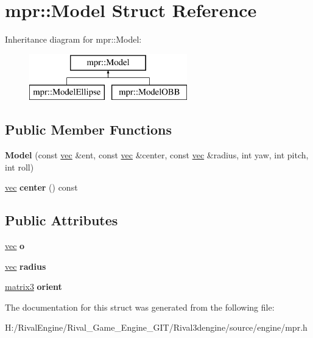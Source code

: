 \hypertarget{structmpr_1_1_model}{}\section{mpr\+:\+:Model Struct Reference}
\label{structmpr_1_1_model}
Inheritance diagram for mpr\+:\+:Model\+:\begin{figure}[H]
\begin{center}
\leavevmode
\includegraphics[height=2.000000cm]{structmpr_1_1_model}
\end{center}
\end{figure}
\subsection*{Public Member Functions}
\begin{DoxyCompactItemize}
\item 
\mbox{\label{structmpr_1_1_model_af762c9a8a690f50382732aedb8e9d04e}} 
{\bfseries Model} (const \hyperlink{structvec}{vec} \&ent, const \hyperlink{structvec}{vec} \&center, const \hyperlink{structvec}{vec} \&radius, int yaw, int pitch, int roll)
\item 
\mbox{\label{structmpr_1_1_model_a73c0246302ebb2743aaacb4dcd9ee921}} 
\hyperlink{structvec}{vec} {\bfseries center} () const
\end{DoxyCompactItemize}
\subsection*{Public Attributes}
\begin{DoxyCompactItemize}
\item 
\mbox{\label{structmpr_1_1_model_a2f1680bb8b63a9b4d6cddbe653a74f89}} 
\hyperlink{structvec}{vec} {\bfseries o}
\item 
\mbox{\label{structmpr_1_1_model_ad2b2d6a39b5eb2ace2ae886e94133dd0}} 
\hyperlink{structvec}{vec} {\bfseries radius}
\item 
\mbox{\label{structmpr_1_1_model_a47957f103ff12d2ffe2ec5da3f6fa51c}} 
\hyperlink{structmatrix3}{matrix3} {\bfseries orient}
\end{DoxyCompactItemize}


The documentation for this struct was generated from the following file\+:\begin{DoxyCompactItemize}
\item 
H\+:/\+Rival\+Engine/\+Rival\+\_\+\+Game\+\_\+\+Engine\+\_\+\+G\+I\+T/\+Rival3dengine/source/engine/mpr.\+h\end{DoxyCompactItemize}
